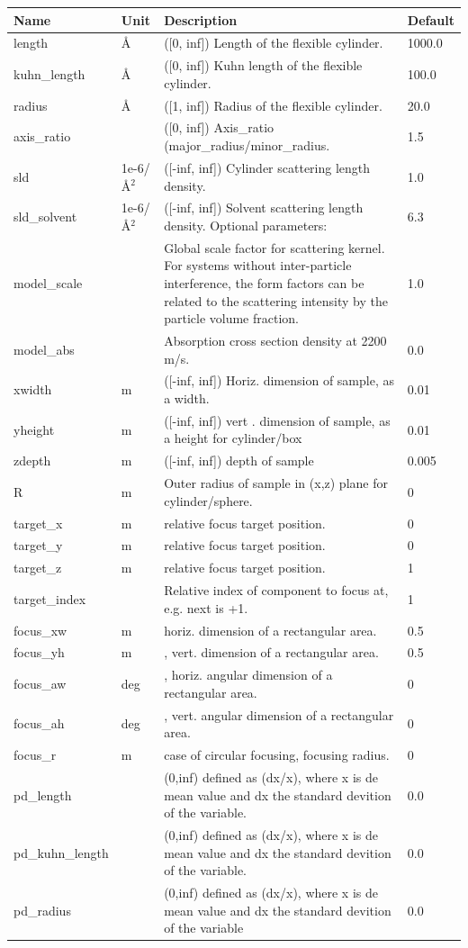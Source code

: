 \begin{longtable}{p{}p{}p{}p{}}
\toprule
\textbf{Name} & \textbf{Unit} & \textbf{Description} & \textbf{Default} \\
\midrule
\endhead
length & \AA{} & ([0, inf]) Length of the flexible cylinder. & 1000.0 \\
kuhn\_length & \AA{} & ([0, inf]) Kuhn length of the flexible cylinder. & 100.0 \\
radius & \AA{} & ([1, inf]) Radius of the flexible cylinder. & 20.0 \\
axis\_ratio &  & ([0, inf]) Axis\_ratio (major\_radius/minor\_radius. & 1.5 \\
sld & 1e-6/\AA{}$^{2}$ & ([-inf, inf]) Cylinder scattering length density. & 1.0 \\
sld\_solvent & 1e-6/\AA{}$^{2}$ & ([-inf, inf]) Solvent scattering length density. Optional parameters: & 6.3 \\
model\_scale &   & Global scale factor for scattering kernel. For systems without inter-particle interference, the form factors can be related to the scattering intensity by the particle volume fraction. & 1.0 \\
model\_abs &   & Absorption cross section density at 2200 m/s. & 0.0 \\
xwidth & m & ([-inf, inf]) Horiz. dimension of sample, as a width. & 0.01 \\
yheight & m & ([-inf, inf]) vert . dimension of sample, as a height for cylinder/box & 0.01 \\
zdepth & m & ([-inf, inf]) depth of sample & 0.005 \\
R & m & Outer radius of sample in (x,z) plane for cylinder/sphere. & 0 \\
target\_x & m & relative focus target position. & 0 \\
target\_y & m & relative focus target position. & 0 \\
target\_z & m & relative focus target position. & 1 \\
target\_index &   & Relative index of component to focus at, e.g. next is +1. & 1 \\
focus\_xw & m & horiz. dimension of a rectangular area. & 0.5 \\
focus\_yh & m & , vert. dimension of a rectangular area. & 0.5 \\
focus\_aw & deg & , horiz. angular dimension of a rectangular area. & 0 \\
focus\_ah & deg & , vert. angular dimension of a rectangular area. & 0 \\
focus\_r & m & case of circular focusing, focusing radius. & 0 \\
pd\_length &  & (0,inf) defined as (dx/x), where x is de mean value and dx the standard devition of the variable. & 0.0 \\
pd\_kuhn\_length &  & (0,inf) defined as (dx/x), where x is de mean value and dx the standard devition of the variable. & 0.0 \\
pd\_radius &  & (0,inf) defined as (dx/x), where x is de mean value and dx the standard devition of the variable & 0.0 \\
\bottomrule
\end{longtable}

